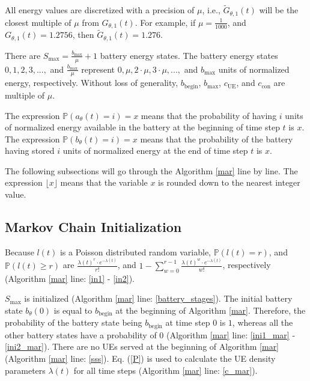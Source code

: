 All energy values are discretized with a precision of $\mu$, i.e., $\tilde{G}_{\theta,1}(t)$ will be the closest multiple of $\mu$ from $G_{\theta,1}(t)$. For example, if $\mu=\frac{1}{1000}$, and $G_{\theta,1}(t)=1.2756$, then $\tilde{G}_{\theta,1}(t)=1.276$.


There are $S_{\mathrm{max}}=\frac{b_{\max}}{\mu}+1$ battery energy states. The battery energy states $0, 1, 2, 3, ...,$ and $\frac{b_{\max}}{\mu}$ represent $0, \mu, 2\cdot\mu, 3\cdot\mu, ...,$ and $b_{\max}$ units of normalized energy, respectively. Without loss of generality, $b_{\mathrm{begin}}$, $b_{\max}$, $c_{\mathrm{UE}}$, and $c_{\mathrm{con}}$ are multiple of $\mu$.

 The expression $\mathbb{P}(a_{\theta}(t)=i)=x$ means that the probability of having $i$ units of normalized energy available in the battery at the beginning of time step $t$ is $x$. The expression $\mathbb{P}(b_{\theta}(t)=i)=x$ means that the probability of the battery having stored $i$ units of normalized energy at the end of time step $t$ is $x$.


The following subsections will go through the Algorithm \ref{mar} line by line. The expression $\lfloor x \rfloor$ means that the variable $x$ is rounded down to the nearest integer value.


\subsection{Markov Chain Initialization\label{Tet}}



Because $l(t)$ is a Poisson distributed random variable, $\mathbb{P}(l(t)= r)$, and $\mathbb{P}(l(t)\geq r)$ are $\frac{\lambda(t)^r \cdot e^{-\lambda(t)}}{r!}$, and $1 - \sum_{w=0}^{r-1}\frac{\lambda(t)^w\cdot e^{-\lambda(t)}}{w!}$, respectively \cite{poisson_formula} (Algorithm \ref{mar} line: \ref{in1} - \ref{in2}). 

$S_{\mathrm{max}}$ is initialized (Algorithm \ref{mar} line: \ref{battery_stages}).
The initial battery state $b_\theta(0)$ is equal to $b_{\mathrm{begin}}$ at the beginning of Algorithm \ref{mar}. Therefore, the probability of the battery state being $b_{\mathrm{begin}}$ at time step $0$ is $1$, whereas all the other battery states have a probability of $0$ (Algorithm \ref{mar} line: \ref{ini1_mar} - \ref{ini2_mar}). There are no UEs served at the beginning of Algorithm \ref{mar} (Algorithm \ref{mar} line: \ref{sss}).
Eq. (\ref{P}) is used to calculate the UE density parameters $\lambda(t)$ for all time steps (Algorithm \ref{mar} line: \ref{c_mar}). 

